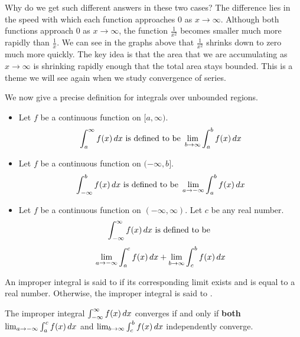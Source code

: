 \documentclass{ximera}
\begin{document}
Why do we get such different answers in these two cases?  The difference lies in the speed with which each function approaches $0$ as $x \to \infty$. Although both functions approach $0$ as $x \to \infty$, the function $\frac{1}{x^2}$ becomes smaller much more rapidly than $\frac{1}{x}$. 
We can see in the graphs above that $\frac{1}{x^2}$ shrinks down to zero much more quickly. The key idea is that the area that we are accumulating as $x\to \infty$ is shrinking rapidly enough that the total area stays bounded. This is a theme we will see again when we study convergence of series. 

We now give a precise definition for integrals over unbounded regions.

\begin{definition}\hfil
\begin{itemize}
\item Let $f$ be a continuous function on $[a,\infty)$.
  \[
  \int_a^\infty f(x) \mathop{}\!d x \text{ is defined to be } \lim_{b\to\infty}\int_a^b f(x) \mathop{}\!d x
  \]
\item Let $f$ be a continuous function on $(-\infty,b]$.
  \[
  \int_{-\infty}^b f(x) \mathop{}\!d x \text{ is defined to be } \lim_{a\to-\infty}\int_a^b f(x) \mathop{}\!d x
  \]
\item Let $f$ be a continuous function on $(-\infty,\infty)$. Let $c$
  be any real number.
  \[
  \int_{-\infty}^\infty f(x) \mathop{}\!d x \text{ is defined to be }
  \]
  \[
  \lim_{a\to-\infty}\int_a^c f(x) \mathop{}\!d x + \lim_{b\to\infty}\int_c^b
  f(x) \mathop{}\!d x
  \]
\end{itemize}
An improper integral is said to  if its corresponding
limit exists and is equal to a real number. Otherwise, the improper
integral is said to . 
\end{definition}

\begin{warning}
  The improper integral $  \int_{-\infty}^\infty f(x) \mathop{}\!d x$ converges if and only if \textbf{both}  $ \lim_{a\to-\infty}\int_a^c f(x) \mathop{}\!d x$
and $  \lim_{b\to\infty}\int_c^b f(x) \mathop{}\!d x$
independently converge.
\end{warning}
\end{document}
